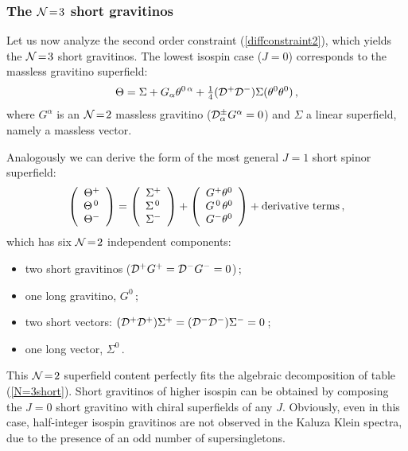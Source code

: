 \documentclass[a4paper,12pt]{article}
\newcommand{\ft}[2]{{\textstyle\frac{#1}{#2}}}
\newcommand{\eqn}[1]{(\ref{#1})}
\begin{document}
\subsubsection{The ${\cal N}\!=\!3$ short gravitinos}
Let us now analyze the second order constraint (\ref{diffconstraint2}),
which yields the ${\cal N}\!=\!3$ short gravitinos.
The lowest isospin case ($J=0$) corresponds to the massless gravitino
superfield:
\begin{equation}
\Theta=\Sigma+G_\alpha\theta^{0\,\alpha}+\ft{1}{4}({\cal D}^+
{\cal D}^-)\Sigma(\theta^0\theta^0)\,,
\end{equation}
where $G^\alpha$ is an ${\cal N}\!=\!2$ massless gravitino
(${\cal D}^\pm_\alpha G^\alpha=0$) and $\Sigma$ a linear superfield,
namely a massless vector.
\par
Analogously we can derive the form of the most general
$J\!=\!1$ short spinor superfield:
\begin{eqnarray}
\left(\begin{array}{c}
\Theta^+\\
\Theta^{\,0\,}\\
\Theta^-
\end{array}\right)=
\left(\begin{array}{c}
\Sigma^+\\
\Sigma^{\,0\,}\\
\Sigma^-
\end{array}\right)+
\left(\begin{array}{c}
G^+\theta^0\\
G^{\,0\,}\theta^0\\
G^-\theta^0
\end{array}\right)+{\rm derivative\ terms}\,,
\label{J=1shgravino}
\end{eqnarray}
which has six ${\cal N}\!=\!2$ independent components:
\begin{itemize}
\item two short  gravitinos
(${\cal D}^+G^+={\cal D}^-G^-=0$)\,;
\item one long  gravitino, $G^0$\,;
\item two short vectors: $({\cal D}^+{\cal D}^+)\Sigma^+
=({\cal D}^-{\cal D}^-)\Sigma^-=0$\,;
\item one long vector, $\Sigma^0$\,.
\end{itemize}
This ${\cal N}\!=\!2$ superfield content perfectly fits the
algebraic decomposition of table \eqn{N=3short}.
Short gravitinos of higher isospin can be obtained by composing
the $J\!=\!0$ short gravitino with chiral superfields of any $J$.
Obviously, even in this case, half-integer isospin gravitinos are
not observed in the Kaluza Klein spectra, due to the presence of
an odd number of supersingletons.
\end{document}
